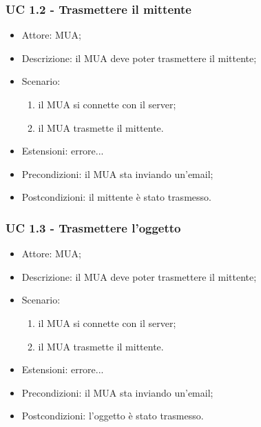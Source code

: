     \subsubsection{UC 1.2 - Trasmettere il mittente} \label{sec: UC 1.2}
    \begin{itemize}
        \item Attore: MUA;
        \item Descrizione: il MUA deve poter trasmettere il mittente;
        \item Scenario:
        \begin{enumerate}
        \item il MUA si connette con il server;
        \item il MUA trasmette il mittente.
        \end{enumerate}
        \item Estensioni: errore... %
        \item Precondizioni: il MUA sta inviando un'email;
        \item Postcondizioni: il mittente è stato trasmesso.
    \end{itemize}
    
    \subsubsection{UC 1.3 - Trasmettere l'oggetto} \label{sec: UC 1.3}
    \begin{itemize}
        \item Attore: MUA;
        \item Descrizione: il MUA deve poter trasmettere il mittente;
        \item Scenario:
        \begin{enumerate}
        \item il MUA si connette con il server;
        \item il MUA trasmette il mittente.
        \end{enumerate}
        \item Estensioni: errore... %
        \item Precondizioni: il MUA sta inviando un'email;
        \item Postcondizioni: l'oggetto è stato trasmesso.
    \end{itemize}


